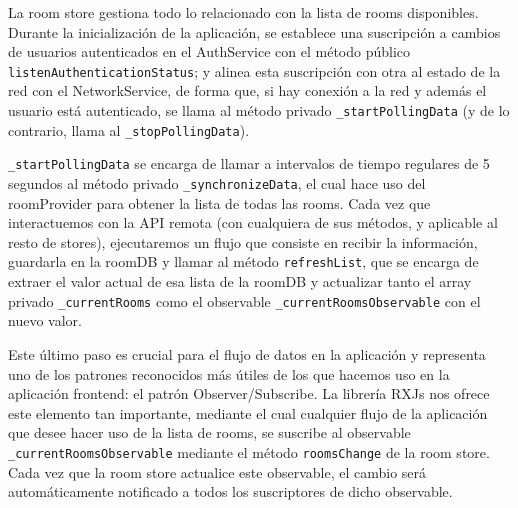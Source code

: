 \vspace{1cm}

La room store gestiona todo lo relacionado con la lista de rooms disponibles. Durante la inicialización de la aplicación, se establece una suscripción a cambios de usuarios autenticados en el AuthService con el método público \verb|listenAuthenticationStatus|; y alinea esta suscripción con otra al estado de la red con el NetworkService, de forma que, si hay conexión a la red y además el usuario está autenticado, se llama al método privado \verb|_startPollingData| (y de lo contrario, llama al \verb|_stopPollingData|).

\vspace{1cm}

\verb|_startPollingData| se encarga de llamar a intervalos de tiempo regulares de 5 segundos al método privado \verb|_synchronizeData|, el cual hace uso del roomProvider para obtener la lista de todas las rooms. Cada vez que interactuemos con la API remota (con cualquiera de sus métodos, y aplicable al resto de stores), ejecutaremos un flujo que consiste en recibir la información, guardarla en la roomDB y llamar al método \verb|refreshList|, que se encarga de extraer el valor actual de esa lista de la roomDB y actualizar tanto el array privado \verb|_currentRooms| como el observable \verb|_currentRoomsObservable| con el nuevo valor.

\vspace{1cm}

Este último paso es crucial para el flujo de datos en la aplicación y representa uno de los patrones reconocidos más útiles de los que hacemos uso en la aplicación frontend: el patrón Observer/Subscribe. La librería RXJs nos ofrece este elemento tan importante, mediante el cual cualquier flujo de la aplicación que desee hacer uso de la lista de rooms, se suscribe al observable \verb|_currentRoomsObservable| mediante el método \verb|roomsChange| de la room store. Cada vez que la room store actualice este observable, el cambio será automáticamente notificado a todos los suscriptores de dicho observable.

\vspace{1cm}

